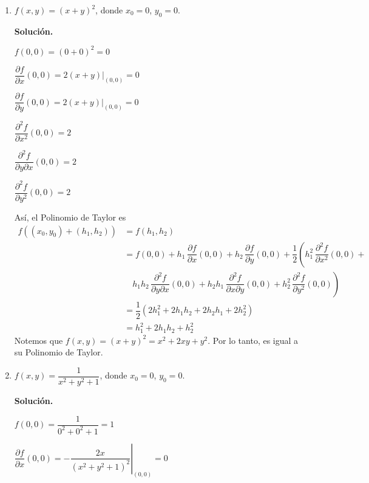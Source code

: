 \documentclass[fleqn, 12pt]{article}
\newcommand{\derivadaparcial}[2]{\dfrac{\partial {#1}}{\partial {#2}}}
\newcommand{\derivadaparcialn}[3]{\dfrac{\partial^{#3} {#1}}{\partial {#2}^{#3}}}
\newcommand{\derivadaparcialnd}[3]{\dfrac{\partial^{2} {#1}}{\partial {#3} \partial {#2}}}
\begin{document}
    \begin{enumerate}
        \item $ f(x,y) = (x + y)^2 $, donde $ x_0 = 0 $, $ y_0 = 0 $.
        
        \textbf{Solución.}

        $ f(0,0) = (0 + 0)^2 = 0 $

        $ \derivadaparcial{f}{x} (0,0) = \left. 2(x + y) \right|_{(0,0)} = 0 $

        $ \derivadaparcial{f}{y} (0,0) = \left. 2(x + y) \right|_{(0,0)} = 0 $

        $ \derivadaparcialn{f}{x}{2} (0,0) = 2 $

        $ \derivadaparcialnd{f}{x}{y} (0,0) = 2 $

        $ \derivadaparcialn{f}{y}{2} (0,0) = 2 $

        Así, el Polinomio de Taylor es
        \begin{align*}
            f((x_0, y_0) + (h_1, h_2)) &= f(h_1, h_2) \\
            &= f(0,0) + h_1 \, \derivadaparcial{f}{x} (0,0) + h_2 \, \derivadaparcial{f}{y} (0,0) + \dfrac{1}{2} \left( h_1^2 \, \derivadaparcialn{f}{x}{2} (0,0) \right. + \\
            & \quad \left. h_1 h_2 \, \derivadaparcialnd{f}{x}{y} (0,0) + h_2 h_1 \, \derivadaparcialnd{f}{y}{x} (0,0) + h_2^2 \, \derivadaparcialn{f}{y}{2} (0,0) \right) \\
            &= \dfrac{1}{2} \left( 2 h_1^2 + 2 h_1 h_2 + 2 h_2 h_1 + 2 h_2^2 \right) \\
            &= h_1^2 + 2 h_1 h_2 + h_2^2
        \end{align*}
        Notemos que $ f(x,y) = (x + y)^2 = x^2 + 2xy + y^2 $. Por lo tanto, es igual a su Polinomio de Taylor.

        \item $ f(x,y) = \dfrac{1}{x^2 + y^2 + 1} $, donde $ x_0 = 0 $, $ y_0 = 0 $.
        
        \textbf{Solución.}

        $ f(0,0) = \dfrac{1}{0^2 + 0^2 + 1} = 1 $

        $ \derivadaparcial{f}{x} (0,0) = \left. - \dfrac{2x}{(x^2 + y^2 + 1)^2} \right|_{(0,0)} = 0 $


\end{enumerate}
\end{document}
